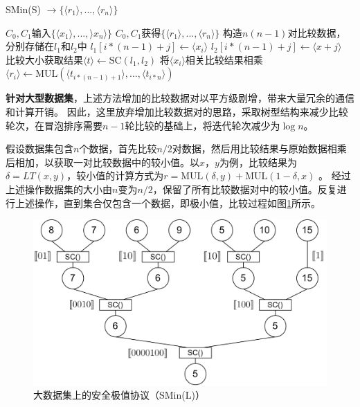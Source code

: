 \begin{algorithm}[htbp]
	\renewcommand{\algorithmicrequire}{\textbf{输入:}}
	\renewcommand{\algorithmicensure}{\textbf{输出:}}
	\caption{SMin(S) $\rightarrow \{\langle r_1 \rangle,...,\langle r_n\rangle\}$}
	\label{alg_smins}
	\begin{algorithmic}[1]
		\REQUIRE $C_0,C_1$输入$ \{\langle x_1 \rangle,...,\rangle x_n\rangle\} $
		\ENSURE $C_0,C_1$获得$\{\langle r_1 \rangle,...,\langle r_n\rangle\}$
		\STATE 构造$ n(n-1) $对比较数据，分别存储在$ l_1 $和$ l_2 $中
		\STATE $ l_1[i*(n-1)+j] \leftarrow \langle x_i \rangle $
		\STATE $ l_2[i*(n-1)+j] \leftarrow \langle x+j \rangle $
		\ENDFOR
		\ENDFOR
		\STATE 比较大小获取结果$ \langle t \rangle \leftarrow \text{SC}(l_1, l_2) $
		\STATE 将$ \langle x_i\rangle $相关比较结果相乘$ \langle r_i \rangle \leftarrow \text{MUL}(\langle t_{i*(n-1)+1}\rangle,...,\langle t_{i*n} \rangle)$
		\ENDFOR
	\end{algorithmic}
\end{algorithm}

\textbf{针对大型数据集}，上述方法增加的比较数据对以平方级剧增，带来大量冗余的通信和计算开销。
因此，这里放弃增加比较数据对的思路，采取树型结构来减少比较轮次，在冒泡排序需要$n-1$轮比较的基础上，将迭代轮次减少为$\log n$。

假设数据集包含$n$个数据，首先比较$n/2$对数据，然后用比较结果与原始数据相乘后相加，以获取一对比较数据中的较小值。以$x$，$y$为例，比较结果为$\delta = LT(x,y) $，较小值的计算方式为$r=\text{MUL}(\delta, y) + \text{MUL}(1-\delta, x)$ 。
经过上述操作数据集的大小由$n$变为$n/2$，保留了所有比较数据对中的较小值。反复进行上述操作，直到集合仅包含一个数据，即极小值，比较过程如图\ref{sminl}所示。
\begin{figure}[htbp]
	\centering
	\includegraphics[scale=0.08]{img/fig1.png}%
	\caption{大数据集上的安全极值协议（SMin(L)）}
	\label{sminl}
\end{figure}

